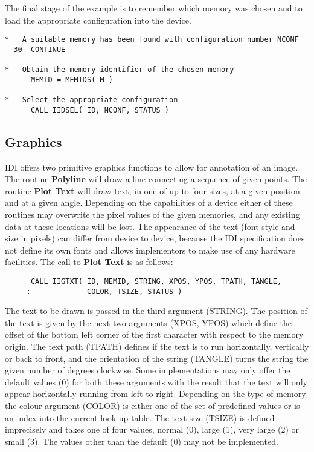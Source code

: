 The final stage of the example is to remember which memory was chosen
and to load the appropriate configuration into the device.
\begin{small}
\begin{verbatim}
*   A suitable memory has been found with configuration number NCONF
  30  CONTINUE

*   Obtain the memory identifier of the chosen memory
      MEMID = MEMIDS( M )

*   Select the appropriate configuration
      CALL IIDSEL( ID, NCONF, STATUS )
\end{verbatim}
\end{small}

\subsection{Graphics}

IDI offers two primitive graphics functions to allow for annotation of an
image. The routine {\bf Polyline} will draw a line connecting a sequence
of given points. The routine {\bf Plot Text} will draw text, in one of
up to four sizes, at a given position and at a given angle. Depending on
the capabilities of a device either of these
routines may overwrite the pixel values of the given memories, and any
existing data at these locations will be lost.
The appearance of the text (font style and size in pixels) can differ
from device to device, because the IDI specification does not define
its own fonts and allows implementors to make use of any hardware
facilities. The call to {\bf Plot Text} is as follows:
\begin{small}
\begin{verbatim}
      CALL IIGTXT( ID, MEMID, STRING, XPOS, YPOS, TPATH, TANGLE,
     :             COLOR, TSIZE, STATUS )
\end{verbatim}
\end{small}
The text to be drawn is passed in the third argument (STRING). The
position of the text is given by the next two arguments (XPOS, YPOS)
which define the offset of the bottom left corner of the first
character with respect to the memory origin. The text path (TPATH)
defines if the text is to run horizontally, vertically or back to front,
and the orientation of the string (TANGLE) turns the string the given
number of degrees clockwise. Some implementations may only offer the
default values (0) for both these arguments with the result that the
text will only appear horizontally running from left to right.
Depending on the type of memory the colour argument (COLOR) is either
one of the set of predefined values or is an index into the current
look-up table. The text size (TSIZE) is defined imprecisely and takes
one of four values, normal (0), large (1), very large (2) or small (3).
The values other than the default (0) may not be implemented.

